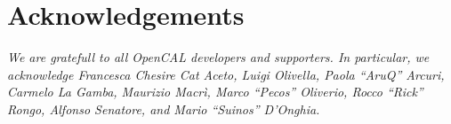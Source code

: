 \chapter*{Acknowledgements}



\newpage
\vspace*{8cm}
\emph{We are gratefull to all OpenCAL developers and
  supporters. In particular, we acknowledge Francesca Chesire Cat
  Aceto, Luigi Olivella, Paola ``AruQ'' Arcuri, Carmelo La Gamba, Maurizio
  Macrì, Marco ``Pecos'' Oliverio, Rocco ``Rick'' Rongo, Alfonso Senatore, and
  Mario ``Suinos'' D'Onghia.}

